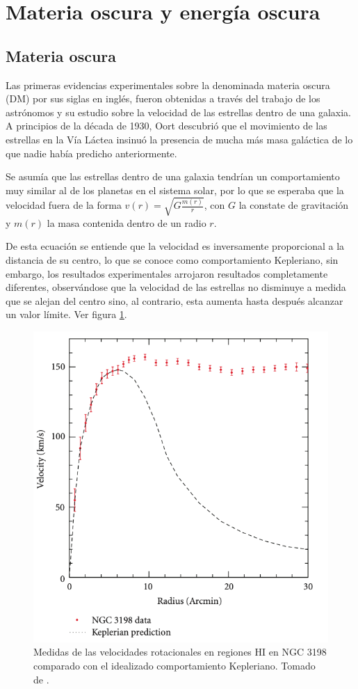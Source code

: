 \documentclass[journal]{IEEEtran}
\begin{document}
 \section{Materia oscura y energía oscura}

\subsection{Materia oscura}

Las primeras evidencias experimentales sobre la denominada materia oscura (DM) por sus siglas en inglés, fueron obtenidas a través del trabajo de los astrónomos y su estudio sobre la velocidad de las estrellas dentro de una galaxia.
A principios de la década de 1930, Oort descubrió que el movimiento de las estrellas en la Vía Láctea insinuó la presencia de mucha más  masa galáctica de lo que nadie había predicho anteriormente.\hspace{.2cm}\cite{K. Garrett}

Se asumía que las estrellas dentro de una galaxia tendrían un comportamiento muy similar al de los planetas en el sistema solar, por lo que se esperaba que la velocidad fuera de la forma $ v(r) = \sqrt{G\frac{m(r)}{r}}$, con $G$ la constate de gravitación y $m(r)$ la masa contenida dentro de un radio $r$. 

De esta ecuación se entiende que la velocidad es inversamente proporcional a la distancia de su centro, lo que se conoce como comportamiento Kepleriano, sin embargo, los resultados experimentales arrojaron resultados completamente diferentes, observándose que la velocidad de las estrellas no disminuye a medida que se alejan del centro sino, al contrario, esta aumenta hasta después alcanzar un valor límite. Ver figura \ref{Velocidades}.


\begin{figure}[!htb]
\centering
\includegraphics[width=\linewidth,height=8 cm]{velociad.png}
\caption{ Medidas de las velocidades rotacionales en regiones HI  en  NGC 3198 comparado con el idealizado comportamiento Kepleriano. Tomado de \hspace{.2cm}\cite{K.G. Begeman}.}
\label{Velocidades}
\end{figure}
\end{document}
